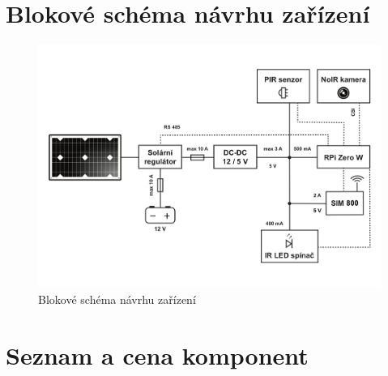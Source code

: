 \clearpage

\section{Blokové schéma návrhu zařízení}
\begin{figure}[!h]
  \begin{center}
    \includegraphics[scale=0.6, angle=90]{obrazky/blokove-schema-nove.png}
  \end{center}
  \caption{Blokové schéma návrhu zařízení}
\end{figure}

\clearpage

\section{Seznam a cena komponent}

